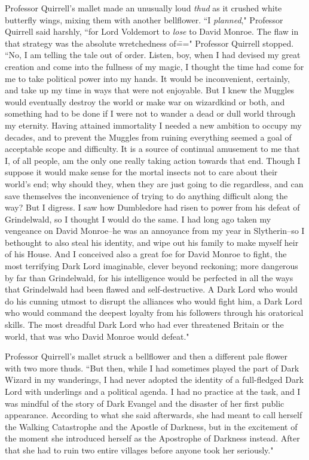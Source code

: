 Professor Quirrell's mallet made an unusually loud \emph{thud} as it crushed white butterfly wings, mixing them with another bellflower. ``I \emph{planned}," Professor Quirrell said harshly, ``for Lord Voldemort to \emph{lose} to David Monroe. The flaw in that strategy was the absolute wretchedness of\===" Professor Quirrell stopped. ``No, I am telling the tale out of order. Listen, boy, when I had devised my great creation and come into the fullness of my magic, I thought the time had come for me to take political power into my hands. It would be inconvenient, certainly, and take up my time in ways that were not enjoyable. But I knew the Muggles would eventually destroy the world or make war on wizardkind or both, and something had to be done if I were not to wander a dead or dull world through my eternity. Having attained immortality I needed a new ambition to occupy my decades, and to prevent the Muggles from ruining everything seemed a goal of acceptable scope and difficulty. It is a source of continual amusement to me that I, of all people, am the only one really taking action towards that end. Though I suppose it would make sense for the mortal insects not to care about their world's end; why should they, when they are just going to die regardless, and can save themselves the inconvenience of trying to do anything difficult along the way? But I digress. I saw how Dumbledore had risen to power from his defeat of Grindelwald, so I thought I would do the same. I had long ago taken my vengeance on David Monroe\---he was an annoyance from my year in Slytherin\---so I bethought to also steal his identity, and wipe out his family to make myself heir of his House. And I conceived also a great foe for David Monroe to fight, the most terrifying Dark Lord imaginable, clever beyond reckoning; more dangerous by far than Grindelwald, for his intelligence would be perfected in all the ways that Grindelwald had been flawed and self-destructive. A Dark Lord who would do his cunning utmost to disrupt the alliances who would fight him, a Dark Lord who would command the deepest loyalty from his followers through his oratorical skills. The most dreadful Dark Lord who had ever threatened Britain or the world, that was who David Monroe would defeat."

Professor Quirrell's mallet struck a bellflower and then a different pale flower with two more thuds. ``But then, while I had sometimes played the part of Dark Wizard in my wanderings, I had never adopted the identity of a full-fledged Dark Lord with underlings and a political agenda. I had no practice at the task, and I was mindful of the story of Dark Evangel and the disaster of her first public appearance. According to what she said afterwards, she had meant to call herself the Walking Catastrophe and the Apostle of Darkness, but in the excitement of the moment she introduced herself as the Apostrophe of Darkness instead. After that she had to ruin two entire villages before anyone took her seriously."

